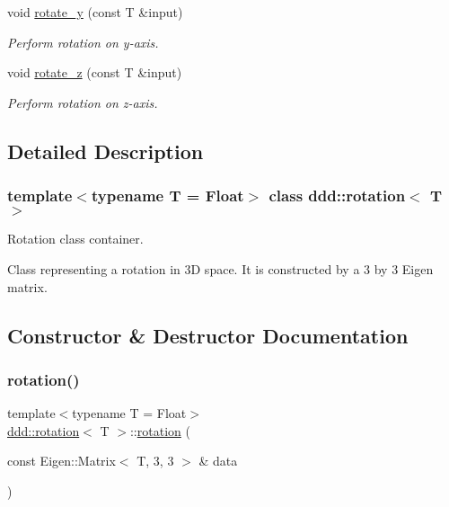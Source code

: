 \begin{DoxyCompactItemize}
void \hyperlink{classddd_1_1rotation_a4f883c5c4c736387fa14f1362d90a90c}{rotate\+\_\+y} (const T \&input)
\begin{DoxyCompactList}\small\item\em Perform rotation on y-\/axis. \end{DoxyCompactList}\item 
void \hyperlink{classddd_1_1rotation_a3ef52c0cd324e1ef83fcb65dba746e10}{rotate\+\_\+z} (const T \&input)
\begin{DoxyCompactList}\small\item\em Perform rotation on z-\/axis. \end{DoxyCompactList}\end{DoxyCompactItemize}


\subsection{Detailed Description}
\subsubsection*{template$<$typename T = Float$>$\newline
class ddd\+::rotation$<$ T $>$}

Rotation class container. 

Class representing a rotation in 3D space. It is constructed by a 3 by 3 Eigen matrix. 

\subsection{Constructor \& Destructor Documentation}
\mbox{\label{classddd_1_1rotation_a10b7bcc20f352a49767460ebde9a1fcf}} 
\subsubsection{\texorpdfstring{rotation()}{rotation()}\hspace{0.1cm}{\footnotesize\ttfamily [1/2]}}
{\footnotesize\ttfamily template$<$typename T  = Float$>$ \\
\hyperlink{classddd_1_1rotation}{ddd\+::rotation}$<$ T $>$\+::\hyperlink{classddd_1_1rotation}{rotation} (\begin{DoxyParamCaption}\item[{const Eigen\+::\+Matrix$<$ T, 3, 3 $>$ \&}]{data }\end{DoxyParamCaption})\hspace{0.3cm}{\ttfamily [inline]}}




